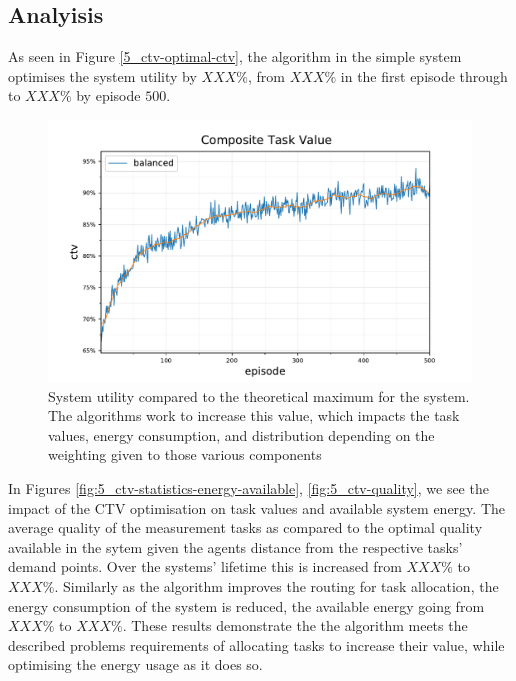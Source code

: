 \subsection{Analyisis}

As seen in Figure \ref{5_ctv-optimal-ctv}, the \algorithmBalanced{}{} algorithm in the simple system optimises the system utility by $XXX\%$, from $XXX\%$ in the first episode through to $XXX\%$ by episode $500$.
\begin{figure}[ht]
	\centering
	\includegraphics[width=0.8\linewidth]{5_ctv-optimal-ctv}
	\captionsetup{labelfont=bf,singlelinecheck=on}
	\caption{System utility compared to the theoretical maximum for the \simulationSimple{}{} system. The algorithms work to increase this value, which impacts the task values, energy consumption, and distribution depending on the weighting given to those various components}
	\label{fig:5_ctv-optimal-ctv}
\end{figure}
In Figures \ref{fig:5_ctv-statistics-energy-available}, \ref{fig:5_ctv-quality}, we see the impact of the CTV optimisation on task values and available system energy. The average quality of the measurement tasks as compared to the optimal quality available in the sytem given the agents distance from the respective tasks' demand points. Over the systems' lifetime this is increased from $XXX\%$ to $XXX\%$. Similarly as the algorithm improves the routing for task allocation, the energy consumption of the system is reduced, the available energy going from  $XXX\%$ to $XXX\%$. These results demonstrate the the algorithm meets the described problems requirements of allocating tasks to increase their value, while optimising the energy usage as it does so.
 
